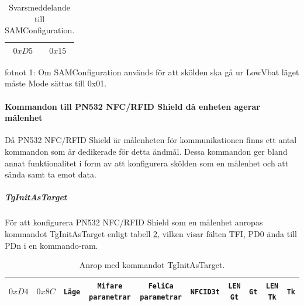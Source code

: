 \documentclass[11pt]{article}
\begin{document}
\begin{table}
\centering
\begin{tabular}{ |c|c| }
\hline
$0xD5$ & $0x15$ \\
\hline
\end{tabular}
\caption{Svarsmeddelande till SAMConfiguration.}
\label{tab:svar_SAMConfiguration}
\end{table}

fotnot 1: Om SAMConfiguration används för att skölden ska gå ur LowVbat läget måste Mode sättas till 0x01.  

\paragraph{Kommandon till PN532 NFC/RFID Shield då enheten agerar målenhet}

Då PN532 NFC/RFID Shield är målenheten för kommunikationen finns ett antal kommandon som är dedikerade för detta ändmål. Dessa kommandon ger bland annat funktionalitet i form av att konfigurera skölden som en målenhet och att sända samt ta emot data.

\subparagraph{TgInitAsTarget}
För att konfigurera PN532 NFC/RFID Shield som en målenhet anropas kommandot TgInitAsTarget enligt tabell \ref{tab:kommando_TgInitAsTarget}, vilken visar fälten TFI, PD0 ända till PDn i en kommando-ram. 

\begin{table}
\centering
\begin{tabular}{ |c|c|c|c|c|c|c|c|c|c| }
\hline
$0xD4$ & $0x8C$ & \texttt{Läge} & \texttt{Mifare parametrar} & \texttt{FeliCa parametrar} & \texttt{NFCID3t} & \texttt{LEN Gt} & \texttt{Gt} & \texttt{LEN Tk} & \texttt{Tk} \\
\hline
\end{tabular}
\caption{Anrop med kommandot TgInitAsTarget.}
\label{tab:kommando_TgInitAsTarget}
\end{table}
\end{document}
